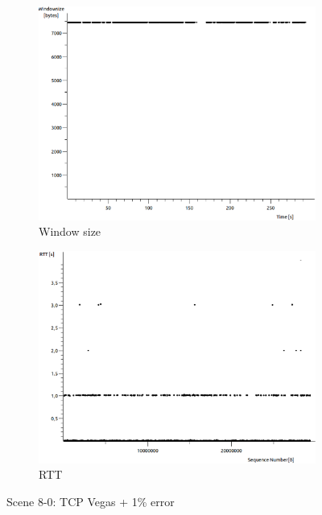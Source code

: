 \documentclass[conference,a4paper]{IEEEtran}
\begin{document}
\begin{figure}
\begin{subfigure}[b]{0.2\textwidth}
  \includegraphics[width=\textwidth]{s8-0_wsize}
  \caption{Window size}
 \end{subfigure}
 \begin{subfigure}[b]{0.2\textwidth}
  \includegraphics[width=\textwidth]{s8-0_rtt}
  \caption{RTT}
 \end{subfigure}
 \caption{Scene 8-0: TCP Vegas + 1\% error}
\end{figure}
\end{document}
